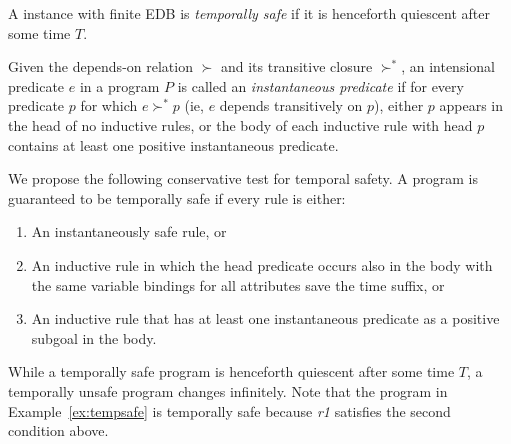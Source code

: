 \begin{definition}
%
A \slang instance with finite EDB is \emph{temporally safe} if it is henceforth
quiescent after some time $T$.
%
\end{definition}

\begin{definition}
%
Given the depends-on relation $\succ$ and its transitive closure $\succ^{*}$,
an intensional predicate $e$ in a program $P$ is called an \emph{instantaneous
predicate} if for every predicate $p$ for which $e \succ^{*} p$ (ie, $e$
depends transitively on $p$), either $p$ appears in the head of no inductive rules, or the body
of each inductive rule with head $p$  contains at least one positive instantaneous 
predicate.

\end{definition}

We propose the following conservative test for temporal safety.  A program is
guaranteed to be temporally safe if every rule is either:

\begin{enumerate}
%
\item An instantaneously safe rule, or
%
\item An inductive rule in which the head predicate occurs also in the
body with the same variable bindings for all attributes save the time suffix,
or
%
\item An inductive rule that has at least one instantaneous predicate as a
positive subgoal in the body.
%
\end{enumerate}


While a temporally safe program is henceforth quiescent after some time $T$,
a temporally unsafe program changes infinitely.  Note that
the \slang program in Example~\ref{ex:tempsafe} is temporally safe because
\emph{r1} satisfies the second condition above.

